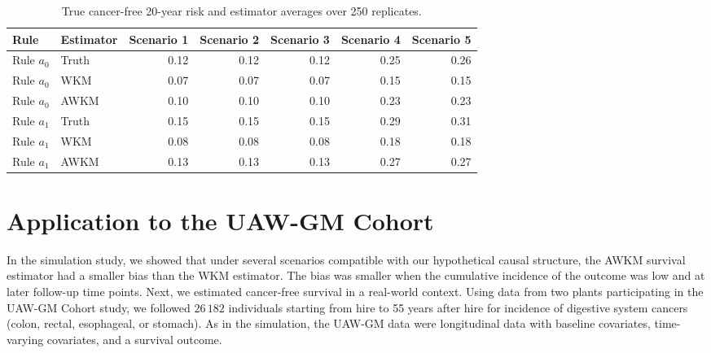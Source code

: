\documentclass[
  11pt,
]{article}
\begin{document}
\begin{table}[H]
\centering
\caption{True cancer-free 20-year risk and estimator averages over 250 replicates.} 
\label{tab:survival}
\begin{tabular}{llrrrrr}
  \toprule
Rule & Estimator & Scenario 1 & Scenario 2 & Scenario 3 & Scenario 4 & Scenario 5 \\ 
  \midrule
Rule $a_0$ & Truth & 0.12 & 0.12 & 0.12 & 0.25 & 0.26 \\ 
  Rule $a_0$ & WKM & 0.07 & 0.07 & 0.07 & 0.15 & 0.15 \\ 
  Rule $a_0$ & AWKM & 0.10 & 0.10 & 0.10 & 0.23 & 0.23 \\ 
   \midrule
Rule $a_1$ & Truth & 0.15 & 0.15 & 0.15 & 0.29 & 0.31 \\ 
  Rule $a_1$ & WKM & 0.08 & 0.08 & 0.08 & 0.18 & 0.18 \\ 
  Rule $a_1$ & AWKM & 0.13 & 0.13 & 0.13 & 0.27 & 0.27 \\ 
   \bottomrule
\end{tabular}
\end{table}

\hypertarget{application-to-the-uaw-gm-cohort}{%
\section{Application to the UAW-GM
Cohort}\label{application-to-the-uaw-gm-cohort}}

In the simulation study, we showed that under several scenarios
compatible with our hypothetical causal structure, the AWKM survival
estimator had a smaller bias than the WKM estimator. The bias was
smaller when the cumulative incidence of the outcome was low and at
later follow-up time points. Next, we estimated cancer-free survival in
a real-world context. Using data from two plants participating in the
UAW-GM Cohort study, we followed \(26\,182\) individuals starting from
hire to 55 years after hire for incidence of digestive system cancers
(colon, rectal, esophageal, or stomach). As in the simulation, the
UAW-GM data were longitudinal data with baseline covariates,
time-varying covariates, and a survival outcome.
\end{document}
